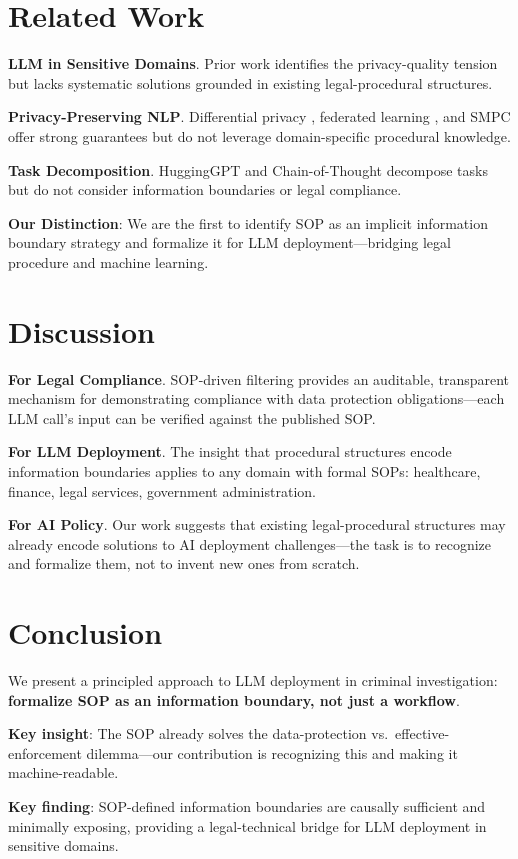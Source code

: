 \documentclass[letterpaper]{article}
\begin{document}
\section{Related Work}

\textbf{LLM in Sensitive Domains}. Prior work identifies the privacy-quality tension \citep{claire20healthcare,alke14legal} but lacks systematic solutions grounded in existing legal-procedural structures.

\textbf{Privacy-Preserving NLP}. Differential privacy \citep{yu22dp}, federated learning \citep{kairouz21fl}, and SMPC \citep{chen22smc} offer strong guarantees but do not leverage domain-specific procedural knowledge.

\textbf{Task Decomposition}. HuggingGPT \citep{shen2023hugginggpt} and Chain-of-Thought decompose tasks but do not consider information boundaries or legal compliance.

\textbf{Our Distinction}: We are the first to identify SOP as an implicit information boundary strategy and formalize it for LLM deployment---bridging legal procedure and machine learning.

\section{Discussion}

\textbf{For Legal Compliance}. SOP-driven filtering provides an auditable, transparent mechanism for demonstrating compliance with data protection obligations---each LLM call's input can be verified against the published SOP.

\textbf{For LLM Deployment}. The insight that procedural structures encode information boundaries applies to any domain with formal SOPs: healthcare, finance, legal services, government administration.

\textbf{For AI Policy}. Our work suggests that existing legal-procedural structures may already encode solutions to AI deployment challenges---the task is to recognize and formalize them, not to invent new ones from scratch.

\section{Conclusion}

We present a principled approach to LLM deployment in criminal investigation: \textbf{formalize SOP as an information boundary, not just a workflow}.

\textbf{Key insight}: The SOP already solves the data-protection vs.~effective-enforcement dilemma---our contribution is recognizing this and making it machine-readable.

\textbf{Key finding}: SOP-defined information boundaries are causally sufficient and minimally exposing, providing a legal-technical bridge for LLM deployment in sensitive domains.



\end{document}
